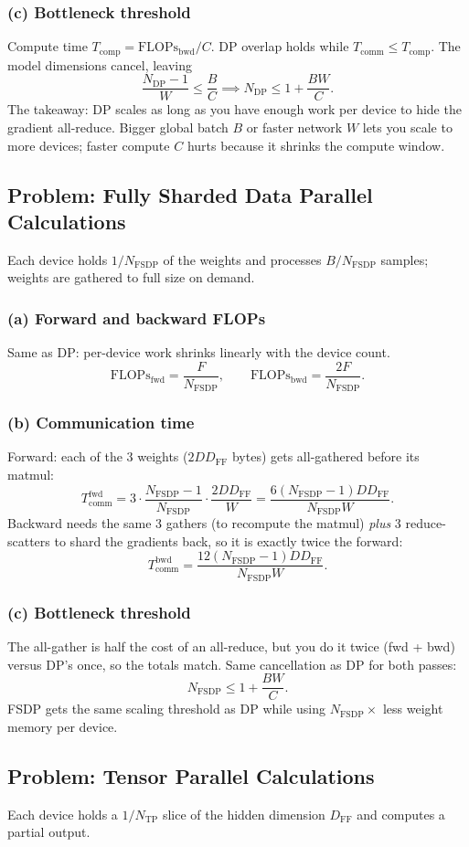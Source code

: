 \documentclass[11pt]{article}
\newcommand{\question}[1]{\subsection*{#1}}
\newcommand{\subquestion}[1]{\subsubsection*{#1}}
\begin{document}
\subquestion{(c) Bottleneck threshold}
Compute time $T_{\mathrm{comp}} = \mathrm{FLOPs}_{\mathrm{bwd}}/C$. DP overlap holds while $T_{\mathrm{comm}} \le T_{\mathrm{comp}}$. The model dimensions cancel, leaving
\[ \frac{N_{\mathrm{DP}}-1}{W} \le \frac{B}{C} \implies N_{\mathrm{DP}} \le 1 + \frac{BW}{C}. \]
The takeaway: DP scales as long as you have enough work per device to hide the gradient all-reduce. Bigger global batch $B$ or faster network $W$ lets you scale to more devices; faster compute $C$ hurts because it shrinks the compute window.

\question{Problem: Fully Sharded Data Parallel Calculations}
Each device holds $1/N_{\mathrm{FSDP}}$ of the weights and processes $B/N_{\mathrm{FSDP}}$ samples; weights are gathered to full size on demand.

\subquestion{(a) Forward and backward FLOPs}
Same as DP: per-device work shrinks linearly with the device count.
\[ \mathrm{FLOPs}_{\mathrm{fwd}} = \frac{F}{N_{\mathrm{FSDP}}}, \qquad \mathrm{FLOPs}_{\mathrm{bwd}} = \frac{2F}{N_{\mathrm{FSDP}}}. \]

\subquestion{(b) Communication time}
Forward: each of the 3 weights ($2DD_{\mathrm{FF}}$ bytes) gets all-gathered before its matmul:
\[ T_{\mathrm{comm}}^{\mathrm{fwd}} = 3 \cdot \frac{N_{\mathrm{FSDP}}{-}1}{N_{\mathrm{FSDP}}} \cdot \frac{2DD_{\mathrm{FF}}}{W} = \frac{6(N_{\mathrm{FSDP}}{-}1)DD_{\mathrm{FF}}}{N_{\mathrm{FSDP}} W}. \]
Backward needs the same 3 gathers (to recompute the matmul) \emph{plus} 3 reduce-scatters to shard the gradients back, so it is exactly twice the forward:
\[ T_{\mathrm{comm}}^{\mathrm{bwd}} = \frac{12(N_{\mathrm{FSDP}}{-}1)DD_{\mathrm{FF}}}{N_{\mathrm{FSDP}} W}. \]

\subquestion{(c) Bottleneck threshold}
The all-gather is half the cost of an all-reduce, but you do it twice (fwd + bwd) versus DP's once, so the totals match. Same cancellation as DP for both passes:
\[ N_{\mathrm{FSDP}} \le 1 + \frac{BW}{C}. \]
FSDP gets the same scaling threshold as DP while using $N_{\mathrm{FSDP}}\times$ less weight memory per device.

\question{Problem: Tensor Parallel Calculations}
Each device holds a $1/N_{\mathrm{TP}}$ slice of the hidden dimension $D_{\mathrm{FF}}$ and computes a partial output.
\end{document}
